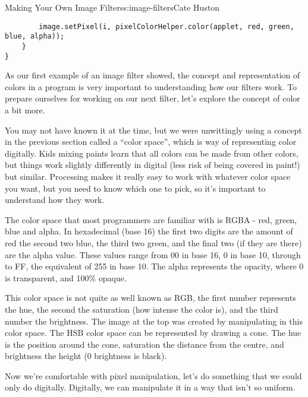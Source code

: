 \begin{aosachapter}{Making Your Own Image Filters}{s:image-filters}{Cate Huston}
\begin{verbatim}
        image.setPixel(i, pixelColorHelper.color(applet, red, green, blue, alpha));
    }
}
\end{verbatim}

\label{color}

As our first example of an image filter showed, the concept and
representation of colors in a program is very important to understanding
how our filters work. To prepare ourselves for working on our next
filter, let's explore the concept of color a bit more.

You may not have known it at the time, but we were unwittingly using a
concept in the previous section called a ``color space'', which is way
of representing color digitally. Kids mixing paints learn that all
colors can be made from other colors, but things work slightly
differently in digital (less risk of being covered in paint!) but
similar. Processing makes it really easy to work with whatever color
space you want, but you need to know which one to pick, so it's
important to understand how they work.

\label{rgb-colors}

The color space that most programmers are familiar with is RGBA - red,
green, blue and alpha. In hexadecimal (base 16) the first two digits are
the amount of red the second two blue, the third two green, and the
final two (if they are there) are the alpha value. These values range
from 00 in base 16, 0 in base 10, through to FF, the equivalent of 255
in base 10. The alpha represents the opacity, where 0 is transparent,
and 100\% opaque.

\label{hsb-or-hsv-colors}

This color space is not quite as well known as RGB, the first number
represents the hue, the second the saturation (how intense the color
is), and the third number the brightness. The image at the top was
created by manipulating in this color space. The HSB color space can be
represented by drawing a cone. The hue is the position around the cone,
saturation the distance from the centre, and brightness the height (0
brightness is black).

\label{extracting-the-dominant-hue-from-an-image}

Now we're comfortable with pixel manipulation, let's do something that
we could only do digitally. Digitally, we can manipulate it in a way
that isn't so uniform.


\end{aosachapter}
